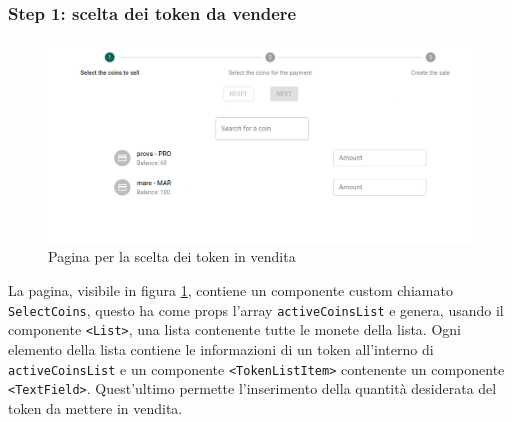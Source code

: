 \documentclass[a4paper]{article}
\begin{document}
        \subsubsection{Step 1: scelta dei token da vendere}
        \begin{figure}[H]
          \includegraphics[width=\textwidth]{coinsToSell.png}
          \caption{Pagina per la scelta dei token in vendita}
          \centering
          \label{fig:selectCoinsToSell}
        \end{figure}
        La pagina, visibile in figura \ref{fig:selectCoinsToSell}, contiene un componente custom chiamato \verb|SelectCoins|, questo ha come props l'array \verb|activeCoinsList| e genera, usando il componente \verb|<List>|, una lista contenente tutte le monete della lista.
        \newline
        Ogni elemento della lista contiene le informazioni di un token all'interno di \verb|activeCoinsList| e un componente
        \verb|<TokenListItem>| contenente un componente \verb|<TextField>|. Quest'ultimo permette l'inserimento della quantità desiderata del token da mettere in vendita.
\end{document}
